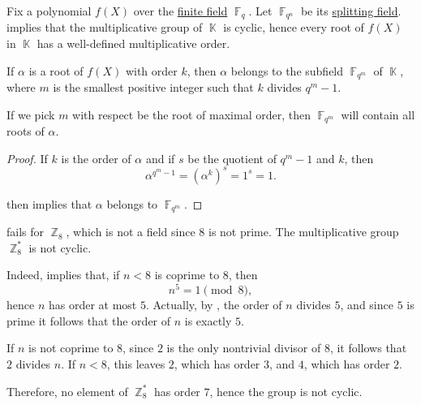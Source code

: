 \begin{corollary}\label{thm:finite_splitting_field}
  Fix a polynomial \( f(X) \) over the \hyperref[def:finite_field]{finite field} \( \BbbF_q \). Let \( \BbbF_{q^n} \) be its \hyperref[def:splitting_field]{splitting field}.  implies that the multiplicative group of \( \BbbK \) is cyclic, hence every root of \( f(X) \) in \( \BbbK \) has a well-defined multiplicative order.

  If \( \alpha \) is a root of \( f(X) \) with order \( k \), then \( \alpha \) belongs to the subfield \( \BbbF_{q^m} \) of \( \BbbK \), where \( m \) is the smallest positive integer such that \( k \) divides \( q^m - 1 \).
\end{corollary}
\begin{comments}
  \item If we pick \( m \) with respect be the root of maximal order, then \( \BbbF_{q^m} \) will contain all roots of \( \alpha \).
\end{comments}
\begin{proof}
  If \( k \) is the order of \( \alpha \) and if \( s \) be the quotient of \( q^m - 1 \) and \( k \), then
  \begin{equation*}
    \alpha^{q^m - 1} = (\alpha^k)^s = 1^s = 1.
  \end{equation*}

   then implies that \( \alpha \) belongs to \( \BbbF_{q^m} \).
\end{proof}

\begin{example}\label{thm:multiplicative_group_of_z8}
   fails for \( \BbbZ_8 \), which is not a field since \( 8 \) is not prime. The multiplicative group \( \BbbZ_8^* \) is not cyclic.

  Indeed,  implies that, if \( n < 8 \) is coprime to \( 8 \), then
  \begin{equation*}
    n^5 = 1 \pmod 8,
  \end{equation*}
  hence \( n \) has order at most \( 5 \). Actually, by , the order of \( n \) divides \( 5 \), and since \( 5 \) is prime it follows that the order of \( n \) is exactly \( 5 \).

  If \( n \) is not coprime to \( 8 \), since \( 2 \) is the only nontrivial divisor of \( 8 \), it follows that \( 2 \) divides \( n \). If \( n < 8 \), this leaves \( 2 \), which has order \( 3 \), and \( 4 \), which has order \( 2 \).

  Therefore, no element of \( \BbbZ_8^* \) has order \( 7 \), hence the group is not cyclic.
\end{example}

